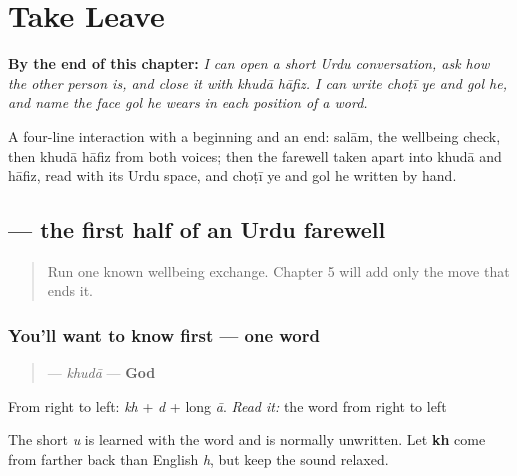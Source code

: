
\chapter{Take Leave}
\label{ch:ur-take-leave}

\begin{chapteropening}
\textbf{By the end of this chapter:} \emph{I can open a short Urdu conversation, ask how the other person is, and close it with khudā hāfiz. I can write choṭī ye and gol he, and name the face gol he wears in each position of a word.}

A four-line interaction with a beginning and an end: salām, the wellbeing check, then khudā hāfiz from both voices; then the farewell taken apart into khudā and hāfiz, read with its Urdu space, and choṭī ye and gol he written by hand.
\end{chapteropening}

\section[\texorpdfstring{\ur{خدا} (khudā)}{خدا (khudā)}]{ — the first half of an Urdu farewell}

\label{lesson:UR-C05-khuda}



\begin{quote}
Run one known wellbeing exchange. Chapter 5 will add only the move that ends it.
\end{quote}

\subsection*{You'll want to know first — one word}
\begin{quote}
\textbf{} — \emph{khudā} — \textbf{God}
\end{quote}

From right to left: \textbf{} \emph{kh} + \textbf{} \emph{d} + \textbf{} long \emph{ā}. \emph{Read it:} the word from right to left

The short \emph{u} is learned with the word and is normally unwritten. Let \textbf{kh} come from farther back than English \emph{h}, but keep the sound relaxed.

